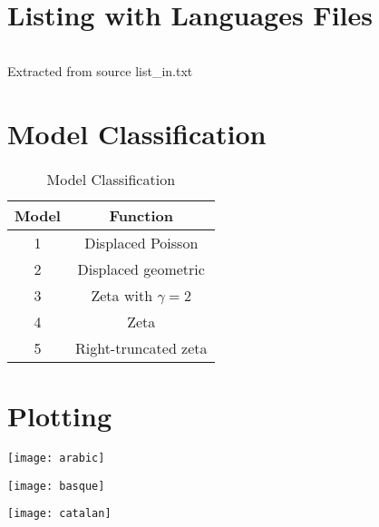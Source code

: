 \documentclass[12pt, a4paper]{article}
\begin{document}
\section{Listing with Languages Files}
\begin{listing}[H]
    \inputminted[breaklines]{text}{./list_in.txt}
    \caption{Extracted from source list\_in.txt}
    \label{apx:src:1}
\end{listing}  

\section{Model Classification}\label{apx:table:model:clasification}
\begin{table}[H]
    \centering
        \begin{tabular}{c c}
        Model & Function \\
         \hline
         1 & Displaced Poisson \\
         2 & Displaced geometric \\
         3 & Zeta with $\gamma = 2$\\
         4 & Zeta \\
         5 & Right-truncated zeta\\
        \end{tabular}
       \caption{Model Classification}
       \label{table:2}
    \end{table}

\section{Plotting}\label{apx:section:plotting}
\begin{minipage}[t]{\linewidth}
    \texttt{[image: arabic]}
    \captionsetup{type=figure}
    \label{fig:arabic}
  \end{minipage}

  \begin{minipage}[t]{\linewidth}
    \texttt{[image: basque]}
    \captionsetup{type=figure}
    \label{fig:basque}
  \end{minipage}

  \begin{minipage}[t]{\linewidth}
    \texttt{[image: catalan]}
    \captionsetup{type=figure}
    \label{fig:catalan}
  \end{minipage}
\end{document}

